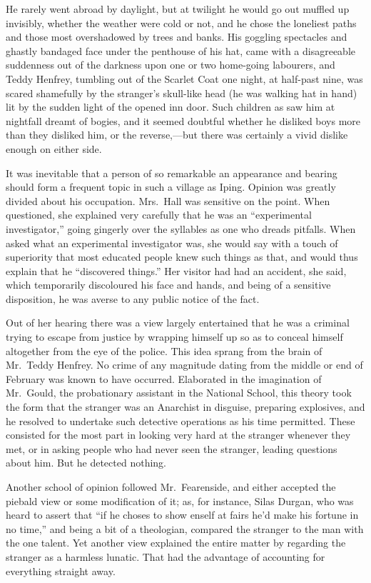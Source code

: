 He rarely went abroad by daylight, but at twilight he would go out muffled up invisibly, whether the weather were cold or not, and he chose the loneliest paths and those most overshadowed by trees and banks. His goggling spectacles and ghastly bandaged face under the penthouse of his hat, came with a disagreeable suddenness out of the darkness upon one or two home-going labourers, and Teddy Henfrey, tumbling out of the Scarlet Coat one night, at half-past nine, was scared shamefully by the stranger’s skull-like head (he was walking hat in hand) lit by the sudden light of the opened inn door. Such children as saw him at nightfall dreamt of bogies, and it seemed doubtful whether he disliked boys more than they disliked him, or the reverse,—but there was certainly a vivid dislike enough on either side.

It was inevitable that a person of so remarkable an appearance and bearing should form a frequent topic in such a village as Iping. Opinion was greatly divided about his occupation. Mrs.\ Hall was sensitive on the point. When questioned, she explained very carefully that he was an “experimental investigator,” going gingerly over the syllables as one who dreads pitfalls. When asked what an experimental investigator was, she would say with a touch of superiority that most educated people knew such things as that, and would thus explain that he “discovered things.” Her visitor had had an accident, she said, which temporarily discoloured his face and hands, and being of a sensitive disposition, he was averse to any public notice of the fact.

Out of her hearing there was a view largely entertained that he was a criminal trying to escape from justice by wrapping himself up so as to conceal himself altogether from the eye of the police. This idea sprang from the brain of Mr.\ Teddy Henfrey. No crime of any magnitude dating from the middle or end of February was known to have occurred. Elaborated in the imagination of Mr.\ Gould, the probationary assistant in the National School, this theory took the form that the stranger was an Anarchist in disguise, preparing explosives, and he resolved to undertake such detective operations as his time permitted. These consisted for the most part in looking very hard at the stranger whenever they met, or in asking people who had never seen the stranger, leading questions about him. But he detected nothing.

Another school of opinion followed Mr.\ Fearenside, and either accepted the piebald view or some modification of it; as, for instance, Silas Durgan, who was heard to assert that “if he choses to show enself at fairs he’d make his fortune in no time,” and being a bit of a theologian, compared the stranger to the man with the one talent. Yet another view explained the entire matter by regarding the stranger as a harmless lunatic. That had the advantage of accounting for everything straight away.

